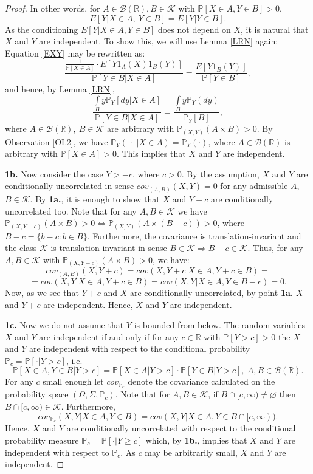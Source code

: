 \documentclass[10pt,a4paper]{amsart}
\newcommand{\B}{\mathcal{B}(\R)}
\newcommand{\KK}{\mathcal{K}}
\newcommand{\PP}{\mathbb{P}}
\newcommand{\R}{\mathbb{R}}
\begin{document}
\begin{proof}
In other words, for $A\in\B, B\in\KK$  with $\PP[X\in A, Y\in B]>0$,
\begin{equation}\label{EXY}
E[Y|X\in A,\ Y\in B]=E[Y| Y \in B].
\end{equation}
 As the conditioning $E[Y|X\in A, Y\in B]$ does not depend on $X$, it is  natural  that $X$ and $Y$ are independent. To show this, we will use Lemma \ref{LRN} again: Equation \eqref{EXY} may be rewritten as:
$$\frac{\frac{1}{\PP[X\in A]}\cdot E[Y1_A(X)1_B(Y)]}{\PP[Y\in B| X \in A]}=\frac{E[Y1_B(Y)]}{\PP[Y\in B]},$$
 and hence, by Lemma \ref{LRN}, 
$$\frac{\int\limits_B y\PP_Y[ dy| X \in A]}{\PP[Y\in B| X \in A]}=\frac{\int\limits_By\PP_Y(dy)}{\PP_Y[ B]},$$
where $A\in\B,\ B\in\KK$  are arbitrary with $\PP_{(X,Y)}(A\times B)>0$.
 By Observation \ref{OL2}, we have $\PP_Y(\ \cdot\ |X\in A)=\PP_Y(\cdot)$, where  $A\in\B$ is arbitrary with $\PP[X\in A]>0$. This implies that $X$ and $Y$ are independent. 

\textbf{1b.} Now consider the case $Y>-c$, where $c>0$. By the assumption, $X$ and $Y$ are conditionally uncorrelated in sense $cov_{(A,B)}(X,Y)=0$ for any admissible $A$,$B\in \KK$. By \textbf{1a.}, it is enough to show that $X$ and $Y+c$ are conditionally uncorrelated too. Note that for any $A,B\in \KK$  we have $\PP_{(X,Y+c)}(
A\times B)>0\Leftrightarrow \PP_{(X,Y)}(A\times(B-c))>0$, where $B-c=\{b-c\colon b\in B\}$. Furthermore, the covariance is translation-invariant and the class $\KK$ is translation invariant in sense $B\in\KK \Rightarrow B-c\in\KK.$ Thus, for any $A,B\in\KK$ with $\PP_{(X,Y+c)}(A\times B)>0$, we have:
$$cov_{(A,B)}(X,Y+c)=cov(X,Y+c|X\in A, Y+c\in B)=$$
$$=cov(X,Y|X\in A, Y+c\in B)=cov(X,Y|X\in A, Y\in B-c)=0.$$
 Now, as we see that $Y+c$ and $X$ are conditionally uncorrelated, by point \textbf{1a.} $X$ and $Y+c$ are independent. Hence, $X$ and $Y$ are independent.

\textbf{1c.} Now we do not assume that $Y$ is bounded from below. The random variables $X$ and $Y$ are independent if and only if for any $c\in\R$ with $\PP[Y>c]>0$ 
the $X$ and $Y$ are independent with respect to the conditional probability $\PP_c=\PP[\cdot| Y>c]$, i.e. 
$$\PP[X\in A, Y\in B|Y>c]=\PP[X\in A| Y>c]\cdot \PP[Y\in B| Y>c], \ A,B\in\B.$$
For any $c$ small enough let $cov_{\PP_c}$ denote the covariance calculated on the probability space $(\Omega,\Sigma,\PP_c)$. Note that for $A,B\in \KK$, if $B\cap [c,\infty)\neq \varnothing$ then $B\cap [c,\infty)\in\KK$. Furthermore,
$$cov_{\PP_c}(X,Y|X\in A, Y\in B)= cov(X,Y|X\in A,Y\in B \cap [c,\infty)).$$
Hence, $X$ and $Y$ are conditionally uncorrelated with respect to the conditional probability measure $\PP_c=\PP[\cdot|Y\geq c]$ which, by \textbf{1b.}, implies that $X$ and $Y$ are independent with respect to $\PP_c$. As $c$ may be arbitrarily small, $X$ and $Y$ are independent. 


\end{proof}
\end{document}
